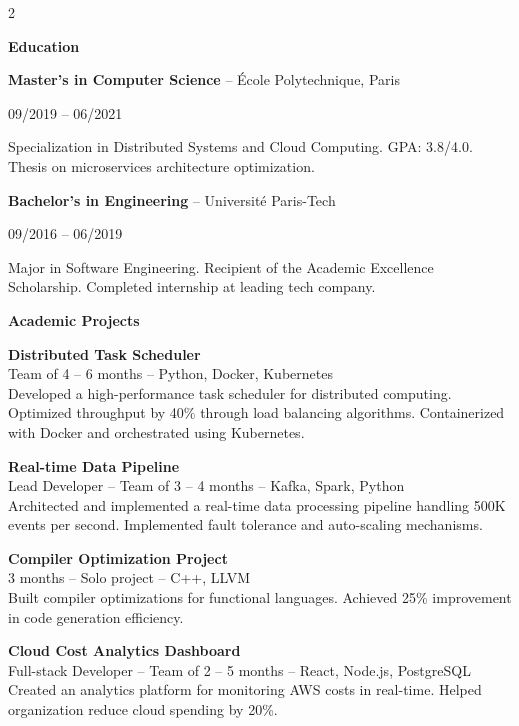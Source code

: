 \documentclass[a4paper,10pt]{article}
\newcommand{\cvsection}[1]{%
    \vspace{0.8em}
    {\color{primary}\large\bfseries #1}
    \vspace{0.4em}
    \par
}
\newcommand{\cvsubsection}[2]{%
    \textbf{#1} {\color{primary}-- #2}
    \par
}
\newcommand{\cvdate}[1]{%
    {\color{lightgray}\small #1}
    \par
}
\newcommand{\cvdesc}[1]{%
    {\color{darkgray}\small #1}
    \par
}
\begin{document}
\setlength{\columnsep}{1.5em}
\begin{paracol}{2}


\cvsection{Education}

\cvsubsection{Master's in Computer Science}{École Polytechnique, Paris}
\cvdate{09/2019 -- 06/2021}
\cvdesc{Specialization in Distributed Systems and Cloud Computing. GPA: 3.8/4.0. Thesis on microservices architecture optimization.}

\vspace{0.8em}
\cvsubsection{Bachelor's in Engineering}{Université Paris-Tech}
\cvdate{09/2016 -- 06/2019}
\cvdesc{Major in Software Engineering. Recipient of the Academic Excellence Scholarship. Completed internship at leading tech company.}

\cvsection{Academic Projects}

\textbf{Distributed Task Scheduler}\\
\cvdesc{Team of 4 -- 6 months -- Python, Docker, Kubernetes\\
Developed a high-performance task scheduler for distributed computing. Optimized throughput by 40\% through load balancing algorithms. Containerized with Docker and orchestrated using Kubernetes.}

\vspace{0.8em}
\textbf{Real-time Data Pipeline}\\
\cvdesc{Lead Developer -- Team of 3 -- 4 months -- Kafka, Spark, Python\\
Architected and implemented a real-time data processing pipeline handling 500K events per second. Implemented fault tolerance and auto-scaling mechanisms.}

\vspace{0.8em}
\textbf{Compiler Optimization Project}\\
\cvdesc{3 months -- Solo project -- C++, LLVM\\
Built compiler optimizations for functional languages. Achieved 25\% improvement in code generation efficiency.}

\vspace{0.8em}
\textbf{Cloud Cost Analytics Dashboard}\\
\cvdesc{Full-stack Developer -- Team of 2 -- 5 months -- React, Node.js, PostgreSQL\\
Created an analytics platform for monitoring AWS costs in real-time. Helped organization reduce cloud spending by 20\%.}


\end{paracol}
\end{document}
